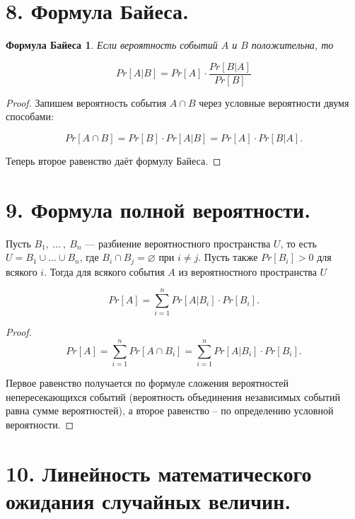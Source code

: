 \documentclass[a4paper, 12pt]{article}
\newtheorem*{baes}{Формула Байеса}
\begin{document}
\section*{8. Формула Байеса.}

\begin{baes}
    Если вероятность событий $A$ и $B$ положительна, то
    
    \[
        Pr[A|B] = Pr[A] \cdot \frac{Pr[B|A]}{Pr[B]}
    \]

\end{baes}

\begin{proof}
    Запишем вероятность события $A \cap B$ через условные вероятности
двумя способами:

\[
    Pr[A \cap B] = Pr[B] \cdot Pr[A|B] = Pr[A] \cdot Pr[B|A].
\]

Теперь второе равенство даёт формулу Байеса.

\end{proof}

\section*{9. Формула полной вероятности.}

Пусть $B_1,\ \ldots\ ,\ B_n$ — разбиение вероятностного пространства $U$, то есть $U = B_1 \cup \ldots \cup B_n$, где $B_i \cap B_j = \varnothing$ при $i \neq j$. Пусть также $Pr[B_i] > 0$ для всякого $i$. Тогда для всякого события $A$ из вероятностного пространства $U$

\[
    Pr[A] = \sum\limits_{i = 1}^n Pr[A|B_i] \cdot Pr[B_i].
\]

\begin{proof}
    
    \[
        Pr[A] = \sum\limits_{i = 1}^n Pr[A \cap B_i] = \sum\limits_{i = 1}^n Pr[A|B_i] \cdot Pr[B_i].
    \]
    
    Первое равенство получается по формуле сложения вероятностей непересекающихся событий (вероятность объединения независимых событий равна сумме вероятностей), а второе равенство – по определению условной вероятности.
    
\end{proof}

\section*{10. Линейность математического ожидания случайных величин.}
\end{document}

